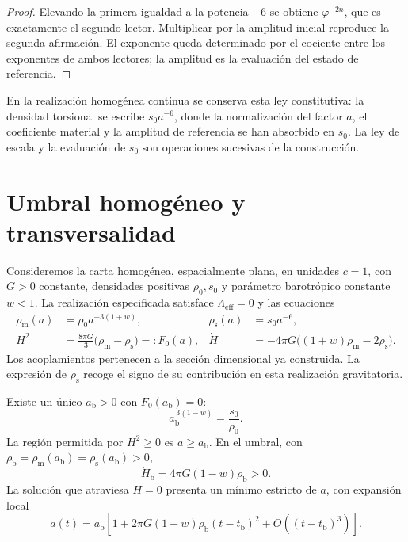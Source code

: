 \begin{proof}
Elevando la primera igualdad a la potencia \(-6\) se obtiene
\(\varphi^{-2n}\), que es exactamente el segundo lector. Multiplicar
por la amplitud inicial reproduce la segunda afirmación. El exponente
queda determinado por el cociente entre los exponentes de ambos
lectores; la amplitud es la evaluación del estado de referencia.
\end{proof}

En la realización homogénea continua se conserva esta ley constitutiva:
la densidad torsional se escribe \(s_0a^{-6}\), donde la normalización
del factor \(a\), el coeficiente material y la amplitud de referencia
se han absorbido en \(s_0\). La ley de escala y la evaluación de
\(s_0\) son operaciones sucesivas de la construcción.

\section{Umbral homogéneo y transversalidad}
\label{x_reciprocidad:vii:sec:umbral-rebote}

Consideremos la carta homogénea, espacialmente plana, en unidades \(c=1\),
con \(G>0\) constante, densidades positivas \(\rho_0,s_0\) y parámetro
barotrópico constante \(w<1\). La realización especificada satisface
\(\Lambda_{\mathrm{eff}}=0\) y las ecuaciones
\begin{align}
 \rho_{\mathrm m}(a)&=\rho_0a^{-3(1+w)},&
 \rho_{\mathrm s}(a)&=s_0a^{-6},\\
 H^2&=\frac{8\pi G}{3}
        \bigl(\rho_{\mathrm m}-\rho_{\mathrm s}\bigr)
        =:F_0(a),&
 \dot H&=-4\pi G
        \bigl((1+w)\rho_{\mathrm m}-2\rho_{\mathrm s}\bigr).
 \label{x_reciprocidad:vii:eq:dinamica-homogenea}
\end{align}
Los acoplamientos pertenecen a la sección dimensional ya construida.
La expresión de \(\rho_{\mathrm s}\) recoge el signo de su contribución
en esta realización gravitatoria.

\begin{theorem}
\label{x_reciprocidad:vii:thm:rebote}
Existe un único \(a_{\mathrm b}>0\) con \(F_0(a_{\mathrm b})=0\):
\[
 a_{\mathrm b}^{\,3(1-w)}=\frac{s_0}{\rho_0}.
\]
La región permitida por \(H^2\geq0\) es \(a\geq a_{\mathrm b}\).
En el umbral, con
\(\rho_{\mathrm b}=\rho_{\mathrm m}(a_{\mathrm b})
                  =\rho_{\mathrm s}(a_{\mathrm b})>0\),
\[
 \dot H_{\mathrm b}=4\pi G(1-w)\rho_{\mathrm b}>0.
\]
La solución que atraviesa \(H=0\) presenta un mínimo estricto de \(a\),
con expansión local
\[
 a(t)=a_{\mathrm b}\left[
 1+2\pi G(1-w)\rho_{\mathrm b}(t-t_{\mathrm b})^2
 +O((t-t_{\mathrm b})^3)\right].
\]
\end{theorem}

